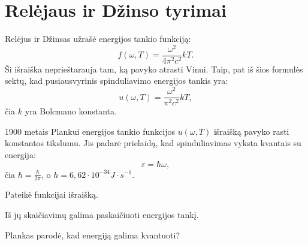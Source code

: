 \section{Relėjaus ir Džinso tyrimai}


Relėjus ir Džinsas užrašė energijos tankio funkciją:
\begin{equation*}
  f(\omega, T) = \frac{\omega^{2}}{4 \pi^{2}c^{2}}kT.
\end{equation*}
Ši išraiška neprieštarauja tam, ką pavyko atrasti Vinui. Taip, pat
iš šios formulės sektų, kad pusiausvyrinis spinduliavimo energijos
tankis yra:
\begin{equation*}
  u(\omega, T) = \frac{\omega^{2}}{\pi^{2}c^{2}}k T,
\end{equation*}
čia $k$ yra Bolcmano konstanta.

1900 metais Plankui energijos tankio funkcijos $u(\omega, T)$
išraišką pavyko rasti konstantos tikslumu. Jis padarė prielaidą,
kad spinduliavimas vyksta kvantais su energija:
\begin{equation*}
  \varepsilon = \hbar \omega,
\end{equation*}
čia $\hbar = \frac{h}{2\pi}$, o $h = 6,62 \cdot 10^{-34} J\cdot s^{-1}$.

\begin{remember}
  \item Pateikė funkcijai išraišką.
  \item Iš jų skaičiavimų galima paskaičiuoti energijos tankį.
  \item Plankas parodė, kad energiją galima kvantuoti?
\end{remember}
